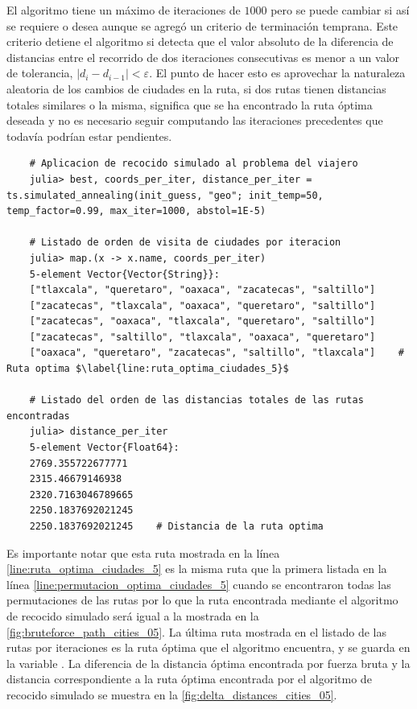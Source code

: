 El algoritmo tiene un máximo de iteraciones de $1000$ pero se puede cambiar si así se requiere o desea aunque se agregó un criterio de terminación temprana. Este criterio detiene el algoritmo si detecta que el valor absoluto de la diferencia de distancias entre el recorrido de dos iteraciones consecutivas es menor a un valor de tolerancia, $|d_{i} - d_{i-1}| < \varepsilon$. El punto de hacer esto es aprovechar la naturaleza aleatoria de los cambios de ciudades en la ruta, si dos rutas tienen distancias totales similares o la misma, significa que se ha encontrado la ruta óptima deseada y no es necesario seguir computando las iteraciones precedentes que todavía podrían estar pendientes.
\begin{verbatim}
    # Aplicacion de recocido simulado al problema del viajero
    julia> best, coords_per_iter, distance_per_iter = ts.simulated_annealing(init_guess, "geo"; init_temp=50, temp_factor=0.99, max_iter=1000, abstol=1E-5)

    # Listado de orden de visita de ciudades por iteracion
    julia> map.(x -> x.name, coords_per_iter)
    5-element Vector{Vector{String}}:
    ["tlaxcala", "queretaro", "oaxaca", "zacatecas", "saltillo"]
    ["zacatecas", "tlaxcala", "oaxaca", "queretaro", "saltillo"]
    ["zacatecas", "oaxaca", "tlaxcala", "queretaro", "saltillo"]
    ["zacatecas", "saltillo", "tlaxcala", "oaxaca", "queretaro"]
    ["oaxaca", "queretaro", "zacatecas", "saltillo", "tlaxcala"]    # Ruta optima $\label{line:ruta_optima_ciudades_5}$

    # Listado del orden de las distancias totales de las rutas encontradas
    julia> distance_per_iter
    5-element Vector{Float64}:
    2769.355722677771
    2315.46679146938
    2320.7163046789665
    2250.1837692021245
    2250.1837692021245    # Distancia de la ruta optima
\end{verbatim}
Es importante notar que esta ruta mostrada en la línea \ref{line:ruta_optima_ciudades_5} es la misma ruta que la primera listada en la línea \ref{line:permutacion_optima_ciudades_5} cuando se encontraron todas las permutaciones de las rutas por lo que la ruta encontrada mediante el algoritmo de recocido simulado será igual a la mostrada en la \cref{fig:bruteforce_path_cities_05}. La última ruta mostrada en el listado de las rutas por iteraciones es la ruta óptima que el algoritmo encuentra, y se guarda en la variable . La diferencia de la distancia óptima encontrada por fuerza bruta y la distancia correspondiente a la ruta óptima encontrada por el algoritmo de recocido simulado se muestra en la \cref{fig:delta_distances_cities_05}.
